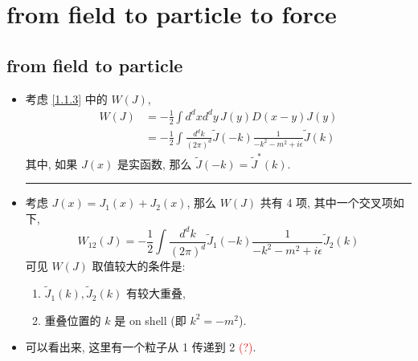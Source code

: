\chapter{from field to particle to force}
\section{from field to particle}
\begin{itemize}
	\item 考虑 \eqref{1.1.3} 中的 $W(J)$,
	\begin{align}
		W(J) &= - \frac{1}{2} \int d^d x d^d y \, J(y) D(x - y) J(y) \\
		&= - \frac{1}{2} \int \frac{d^d k}{(2 \pi)^d} \tilde{J}(- k) \frac{1}{- k^2 - m^2 + i \epsilon} \tilde{J}(k)
	\end{align}
	其中, 如果 $J(x)$ 是实函数, 那么 $\tilde{J}(- k) = \tilde{J}^*(k)$.
	
	\noindent\rule[0.5ex]{\linewidth}{0.5pt} %
	
	\item 考虑 $J(x) = J_1(x) + J_2(x)$, 那么 $W(J)$ 共有 4 项, 其中一个交叉项如下,
	\begin{equation}
		W_{1 2}(J) = - \frac{1}{2} \int \frac{d^d k}{(2 \pi)^d} \tilde{J}_1(- k) \frac{1}{- k^2 - m^2 + i \epsilon} \tilde{J}_2(k)
	\end{equation}
	可见 $W(J)$ 取值较大的条件是:
	\begin{enumerate}
		\item $\tilde{J}_1(k), \tilde{J}_2(k)$ 有较大重叠,
		
		\item 重叠位置的 $k$ 是 on shell (即 $k^2 = - m^2$).
	\end{enumerate}
	
	\item 可以看出来, 这里有一个粒子从 1 传递到 2 \textcolor{red}{(?)}.
\end{itemize}

